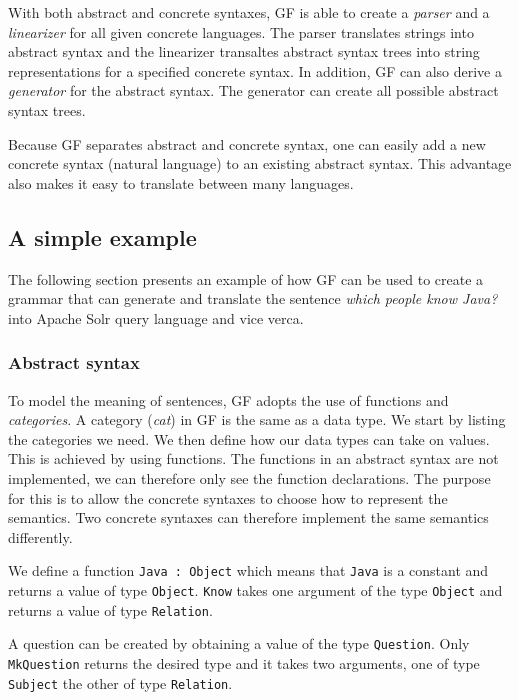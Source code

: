 With both abstract and concrete syntaxes, GF is able to create a \emph{parser} and a \emph{linearizer} for all given concrete languages. The parser translates strings into abstract syntax and the linearizer transaltes abstract syntax trees into string representations for a specified concrete syntax. In addition, GF can also derive a \emph{generator} for the abstract syntax. The generator can create all possible abstract syntax trees.

Because GF separates abstract and concrete syntax, one can easily add a new concrete syntax (natural language) to an existing abstract syntax. This advantage also makes it easy to translate between many languages.

\subsection{A simple example}
The following section presents an example of how GF can be used to create a grammar that can generate and translate the sentence \emph{which people know Java?} into Apache Solr query language and vice verca.

\subsubsection*{Abstract syntax}
To model the meaning of sentences, GF adopts the use of functions and \emph{categories}. A category (\emph{cat}) in GF is the same as a data type. We start by listing the categories we need. We then define how our data types can take on values. This is achieved by using functions. The functions in an abstract syntax are not implemented, we can therefore only see the function declarations. The purpose for this is to allow the concrete syntaxes to choose how to represent the semantics. Two concrete syntaxes can therefore implement the same semantics differently.

We define a function \texttt{Java : Object} which means that \texttt{Java} is a constant  and returns a value of type \texttt{Object}. \texttt{Know} takes one argument of the type \texttt{Object} and returns a value of type \texttt{Relation}.

A question can be created by obtaining a value of the type \texttt{Question}. Only \texttt{MkQuestion} returns the desired type and it takes two arguments, one of type \texttt{Subject} the other of type \texttt{Relation}.

